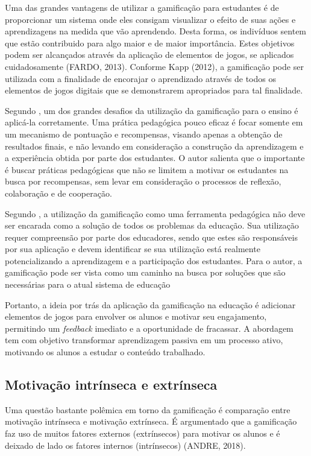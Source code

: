 \documentclass[
	12pt,				%
	oneside,			%
	a4paper,			%
	english,			%
	french,				%
	spanish,			%
	brazil,				%
	]{abntex2}
\begin{document}
Uma das grandes vantagens de utilizar a gamificação para estudantes é de proporcionar um sistema onde eles consigam visualizar o efeito de suas ações e aprendizagens na medida que vão aprendendo. Desta forma, os indivíduos sentem que estão contribuido para algo maior e de maior importância. Estes objetivos podem ser alcançados através da aplicação de elementos de jogos, se aplicados cuidadosamente (FARDO, 2013). Conforme Kapp (2012), a gamificação pode ser utilizada com a finalidade de encorajar o aprendizado através de todos os elementos de jogos digitais que se demonstrarem apropriados para tal finalidade.  

Segundo \citet{fardo2013gamificaccao}, um dos grandes desafios da utilização da gamificação para o ensino é aplicá-la corretamente. Uma prática pedagógica pouco eficaz é focar somente em um mecanismo de pontuação e recompensas, visando apenas a obtenção de resultados finais, e não levando em consideração a construção da aprendizagem e a experiência obtida por parte dos estudantes. O autor salienta que o importante é buscar práticas pedagógicas que não se limitem a motivar os estudantes na busca por recompensas, sem levar em consideração o processos de reflexão, colaboração e de cooperação.

Segundo \citet{fardo2013gamificaccao}, a utilização da gamificação como uma ferramenta pedagógica não deve ser encarada como a solução de todos os problemas da educação. Sua utilização requer compreensão por parte dos educadores, sendo que estes são responsáveis por sua aplicação e devem identificar se sua utilização está realmente potencializando a aprendizagem e a participação dos estudantes. Para o autor, a gamificação pode ser vista como um caminho na busca por soluções que são necessárias para o atual sistema de educação

Portanto, a ideia por trás da aplicação da gamificação na educação é adicionar elementos de jogos para envolver os alunos e motivar seu engajamento, permitindo um \textit{feedback} imediato e a oportunidade de fracassar. A abordagem tem com objetivo transformar aprendizagem passiva em um processo ativo, motivando os alunos a estudar o conteúdo trabalhado.

\subsection{Motivação intrínseca e extrínseca}

Uma questão bastante polêmica em torno da gamificação é comparação entre motivação intrínseca e motivação extrínseca. É argumentado que a gamificação faz uso de muitos fatores externos (extrínsecos) para motivar os alunos e é deixado de lado os fatores internos (intrínsecos) (ANDRE, 2018).
\end{document}
